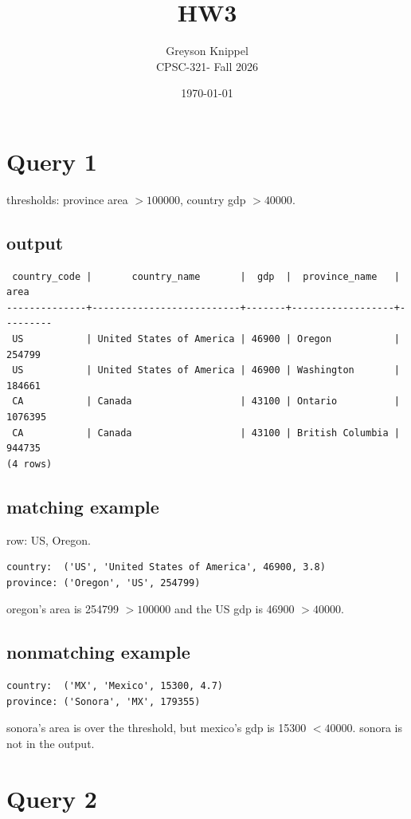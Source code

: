 \documentclass[11pt]{article}
\title{HW3}
\author{
Greyson Knippel \\[4pt]
CPSC-321- Fall 2026\\[4pt]
}
\date{\today}
\begin{document}
\maketitle

\section*{Query 1}

thresholds: province area $> 100000$, country gdp $> 40000$.

\subsection*{output}
{\small
\begin{verbatim}
 country_code |       country_name       |  gdp  |  province_name   |  area
--------------+--------------------------+-------+------------------+---------
 US           | United States of America | 46900 | Oregon           |  254799
 US           | United States of America | 46900 | Washington       |  184661
 CA           | Canada                   | 43100 | Ontario          | 1076395
 CA           | Canada                   | 43100 | British Columbia |  944735
(4 rows)
\end{verbatim}
}

\subsection*{matching example}
row: US, Oregon.
\begin{verbatim}
country:  ('US', 'United States of America', 46900, 3.8)
province: ('Oregon', 'US', 254799)
\end{verbatim}
oregon's area is 254799 $> 100000$ and the US gdp is 46900 $> 40000$.

\subsection*{nonmatching example}
\begin{verbatim}
country:  ('MX', 'Mexico', 15300, 4.7)
province: ('Sonora', 'MX', 179355)
\end{verbatim}
sonora's area is over the threshold, but mexico's gdp is 15300 $< 40000$. sonora is not in the output.

\section*{Query 2}
\end{document}
